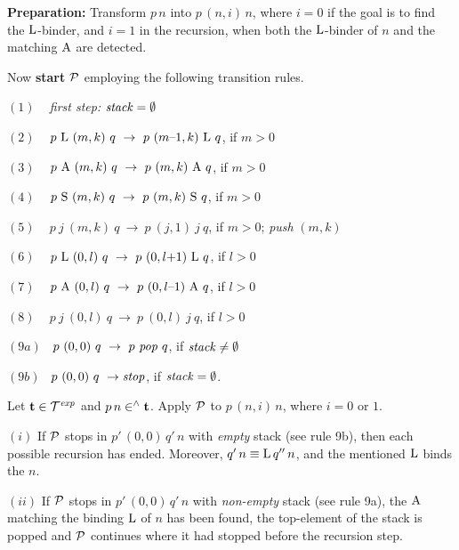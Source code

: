 \documentclass[submission,copyright,creativecommons]{eptcs}
\begin{document}
\begin{Proc}\label{DefAlgBin}

{\bf Preparation:} Transform $p \, n$ into $p \, (n,i) \, n$, where $i = 0$ if the goal is to find the ${\rm L}$-binder, and $i = 1$ in the recursion, when both the ${\rm L}$-binder of $n$ and the matching ${\rm A}$ are detected.

Now {\bf start} ${\cal P}$ employing the following transition rules.

\smallskip

$(1)$ ~ {\it first step:} ${\it stack} = \emptyset$

$(2)$ ~ $p ~ {\rm L} ~ (m,k) ~ q ~ \rightarrow ~ p ~ (m \makebox{--} 1,k) ~ {\rm L} ~ q$, if $m > 0$

$(3)$ ~ $p ~ {\rm A} ~ (m,k) ~ q ~ \rightarrow ~ p ~ (m,k) ~ {\rm A} ~ q$, if $m > 0$

$(4)$ ~ $p ~ {\rm S} ~ (m,k) ~ q ~ \rightarrow ~ p ~ (m,k) ~ {\rm S} ~ q$, if $m > 0$

$(5)$ ~ $p ~ j ~ (m,k) ~ q ~ \rightarrow ~ p ~ (j,1) ~ j ~ q$, if $m > 0$; {\it push} $(m,k)$

$(6)$ ~ $p ~ {\rm L} ~ (0,l) ~ q ~ \rightarrow ~ p ~ (0,l \makebox{+} 1) ~ {\rm L} ~ q$, if $l > 0$

$(7)$ ~ $p ~ {\rm A} ~ (0,l) ~ q ~ \rightarrow ~ p ~ (0,l \makebox{--} 1) ~ {\rm A} ~ q$, if $l > 0$

$(8)$ ~ $p ~ j ~ (0,l) ~ q ~ \rightarrow ~ p ~ (0,l) ~ j ~ q$, if $l > 0$

$(9a)$ \, $p ~ (0,0)  ~ q ~ \rightarrow ~ p ~ {\it pop}  ~ q$, if  ${\it stack} \not = \emptyset$

$(9b)$ \, $p ~ (0,0) ~ q ~ \rightarrow {\it stop}$, if ${\it stack} = \emptyset$.

\end{Proc}




\begin{Lem}\label{LemALBlo}
Let ${\bf t} \in {\cal T}^{\it exp}$ and $p \, n \in^{\wedge} {\bf t}$.  Apply ${\cal P}$ to $p \, (n,i) \, n$, where $i = 0$ or $1$.

$(i)$ If ${\cal P}$ stops in $p' \, (0,0) \, q' \, n$ with {\em empty\/} stack (see rule 9b), then each possible recursion has ended. Moreover, $q' \, n \equiv {\rm L} \, q'' \, n$, and the mentioned ${\rm L}$ binds the $n$.

$(ii)$ If ${\cal P}$ stops in $p' \, (0,0) \, q' \, n$ with {\em non-empty\/} stack (see rule 9a), the ${\rm A}$ matching the binding ${\rm L}$ of $n$ has been found, the top-element of the stack is popped and ${\cal P}$ continues where it had stopped before the recursion step.
\end{Lem}
\end{document}
